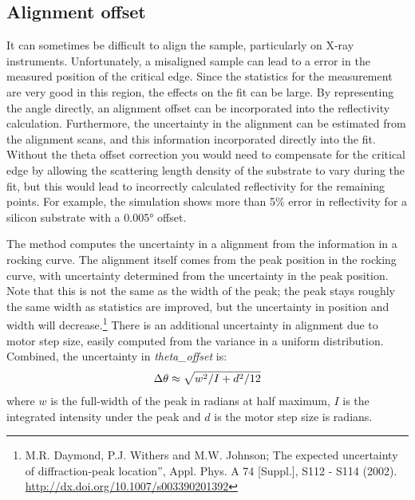 \documentclass[letterpaper,10pt,english]{sphinxmanual}
\begin{document}
\subsection{Alignment offset}
\label{guide/data:alignment-offset}\label{guide/data:data-alignment}
It can sometimes be difficult to align the sample, particularly on
X-ray instruments.  Unfortunately, a misaligned sample can lead to
a error in the measured position of the critical edge.  Since the
statistics for the measurement are very good in this region, the
effects on the fit can be large.  By representing the angle directly,
an alignment offset can be incorporated into the reflectivity calculation.
Furthermore, the uncertainty in the alignment can be estimated from
the alignment scans, and this information incorporated directly into
the fit.  Without the theta offset correction you would need to
compensate for the critical edge by allowing the scattering length
density of the substrate to vary during the fit, but this would lead to
incorrectly calculated reflectivity for the remaining points.  For
example, the simulation  shows more than 5\% error
in reflectivity for a silicon substrate with a 0.005° offset.

The method
{\hyperref[api/probe:refl1d.probe.Probe.alignment_uncertainty]{}}
computes the uncertainty in a alignment from the information in a
rocking curve.  The alignment itself comes from the peak position in
the rocking curve, with uncertainty determined from the uncertainty
in the peak position.  Note that this is not the same as the width
of the peak; the peak stays roughly the same width as statistics are
improved, but the uncertainty in position and width will
decrease.\footnote{
M.R. Daymond, P.J. Withers and M.W. Johnson;
The expected uncertainty of diffraction-peak location'',
Appl. Phys. A 74 {[}Suppl.{]}, S112 - S114 (2002).
\href{http://dx.doi.org/10.1007/s003390201392}{http://dx.doi.org/10.1007/s003390201392}
} There is an additional uncertainty in
alignment due to motor step size, easily computed from the
variance in a uniform distribution.  Combined, the uncertainty
in \emph{theta\_offset} is:
\begin{gather}
\begin{split}\Delta\theta \approx \sqrt{w^2/I + d^2/12}\end{split}\notag
\end{gather}
where $w$ is the full-width of the peak in radians at half maximum,
$I$ is the integrated intensity under the peak and $d$ is the motor
step size is radians.
\end{document}
